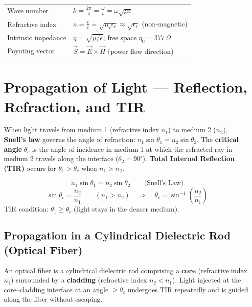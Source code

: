 \documentclass[12pt,a4paper]{article}
\renewcommand{\arraystretch}{1.45}
\begin{document}
\begin{tcolorbox}[formulabox, title={\textbf{Key EM Wave Parameters}}]
\renewcommand{\arraystretch}{1.55}
\begin{tabularx}{\linewidth}{B{4.5cm} X}
Wave number & $k = \displaystyle\frac{2\pi}{\lambda} = \frac{\omega}{v} = \omega\sqrt{\mu\epsilon}$ \\[6pt]
Refractive index & $n = \displaystyle\frac{c}{v} = \sqrt{\mu_r \epsilon_r} \approx \sqrt{\epsilon_r}$ (non-magnetic) \\[6pt]
Intrinsic impedance & $\eta = \sqrt{\mu/\epsilon}$; \quad free space $\eta_0 = 377\,\Omega$ \\[4pt]
Poynting vector & $\vec{S} = \vec{E} \times \vec{H}$ \quad (power flow direction) \\[4pt]
\end{tabularx}
\end{tcolorbox}

\section{Propagation of Light --- Reflection, Refraction, and TIR}

\begin{tcolorbox}[defbox, title={\textbf{Snell's Law and Critical Angle}}]
When light travels from medium 1 (refractive index $n_1$) to medium 2 ($n_2$), \textbf{Snell's law} governs the angle of refraction: $n_1 \sin\theta_1 = n_2 \sin\theta_2$. The \textbf{critical angle} $\theta_c$ is the angle of incidence in medium 1 at which the refracted ray in medium 2 travels along the interface ($\theta_2 = 90^\circ$). \textbf{Total Internal Reflection (TIR)} occurs for $\theta_1 > \theta_c$ when $n_1 > n_2$.
\end{tcolorbox}

\begin{tcolorbox}[formulabox, title={\textbf{Snell's Law and Critical Angle Formulas}}]
\[
n_1 \sin\theta_1 = n_2 \sin\theta_2 \qquad \text{(Snell's Law)}
\]
\[
\sin\theta_c = \frac{n_2}{n_1} \qquad (n_1 > n_2) \quad \Rightarrow \quad \theta_c = \sin^{-1}\!\left(\frac{n_2}{n_1}\right)
\]
TIR condition: $\theta_1 \geq \theta_c$ \quad (light stays in the denser medium).
\end{tcolorbox}

\subsection{Propagation in a Cylindrical Dielectric Rod (Optical Fiber)}
An optical fiber is a cylindrical dielectric rod comprising a \textbf{core} (refractive index $n_1$) surrounded by a \textbf{cladding} (refractive index $n_2 < n_1$). Light injected at the core--cladding interface at an angle $\geq \theta_c$ undergoes TIR repeatedly and is guided along the fiber without escaping.
\end{document}
